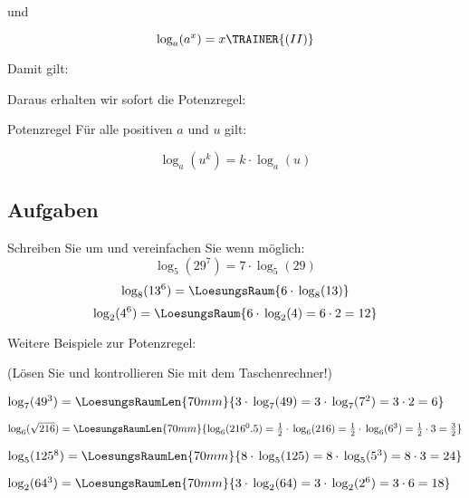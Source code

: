  und

 $$\log_a(a^x) = x\TRAINER{ (II)}$$


 Damit gilt: 

 
 Daraus erhalten wir sofort die Potenzregel:

 \begin{gesetz}{Potenzregel}{}
   Für alle positiven $a$ und $u$ gilt:

   $$\log_a(u^k) = k\cdot{} \log_a(u)$$
 \end{gesetz}
\newpage 

 \subsection*{Aufgaben}

 \begin{center}
 \end{center}

 Schreiben Sie um und vereinfachen Sie wenn möglich:
 $$\log_5(29^7) = 7\cdot{}\log_5(29)$$
 $$\log_8(13^6) = \LoesungsRaum{6\cdot{}\log_8(13)}$$
 $$\log_2(4^6) = \LoesungsRaum{6\cdot{}\log_2(4) = 6\cdot{} 2 = 12}$$
 
 
Weitere Beispiele zur Potenzregel:

(Lösen Sie und kontrollieren Sie mit dem Taschenrechner!)

 $\log_7(49^3) = \LoesungsRaumLen{70mm}{3\cdot{}\log_7(49) = 3 \cdot{}  \log_7(7^2) = 3\cdot{} 2 = 6}$

 $\log_6(\sqrt{216}) = \LoesungsRaumLen{70mm}{\log_6(216^0.5)= \frac12
   \cdot{}\log_6(216) = \frac12 \cdot{}  \log_6(6^3) = \frac12\cdot{} 3 = \frac32}$

 $\log_5(125^8) = \LoesungsRaumLen{70mm}{8 \cdot{}\log_5(125) = 8 \cdot{}  \log_5(5^3) =  8\cdot{} 3 = 24}$

 $\log_2(64^3) = \LoesungsRaumLen{70mm}{3 \cdot{}\log_2(64) = 3 \cdot{}  \log_2(2^6) =  3\cdot{} 6 = 18}$
 \TNTeop{}
 
